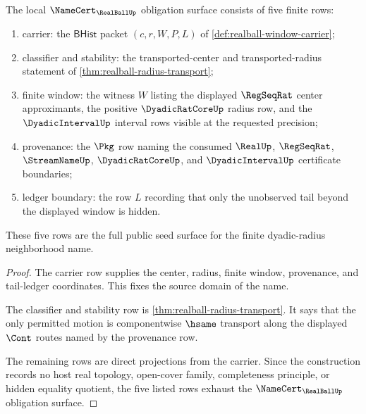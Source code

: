 \begin{theorem}
\label{thm:realball-finite-window-namecert}
The local $\NameCert_{\RealBallUp}$ obligation surface consists of five finite rows:
\begin{enumerate}
\item carrier: the $\mathsf{BHist}$ packet $(c,r,W,P,L)$ of \autoref{def:realball-window-carrier};
\item classifier and stability: the transported-center and transported-radius statement of \autoref{thm:realball-radius-transport};
\item finite window: the witness $W$ listing the displayed $\RegSeqRat$ center approximants, the positive $\DyadicRatCoreUp$ radius row, and the $\DyadicIntervalUp$ interval rows visible at the requested precision;
\item provenance: the $\Pkg$ row naming the consumed $\RealUp$, $\RegSeqRat$, $\StreamNameUp$, $\DyadicRatCoreUp$, and $\DyadicIntervalUp$ certificate boundaries;
\item ledger boundary: the row $L$ recording that only the unobserved tail beyond the displayed window is hidden.
\end{enumerate}
These five rows are the full public seed surface for the finite dyadic-radius neighborhood name.
\end{theorem}
\begin{proof}
The carrier row supplies the center, radius, finite window, provenance, and tail-ledger coordinates. This fixes the source domain of the name.

The classifier and stability row is \autoref{thm:realball-radius-transport}. It says that the only permitted motion is componentwise $\hsame$ transport along the displayed $\Cont$ routes named by the provenance row.

The remaining rows are direct projections from the carrier. Since the construction records no host real topology, open-cover family, completeness principle, or hidden equality quotient, the five listed rows exhaust the $\NameCert_{\RealBallUp}$ obligation surface.
\end{proof}


